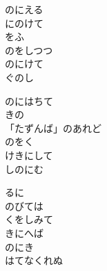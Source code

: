 \documentclass[10pt,b5j]{tarticle} %
\begin{document}
\vspace{1.5em} %
\newcommand{\linespace}{0.5em} %
\newcommand{\blocksize}{0.5\hsize} %
\begin{enumerate} %
    \begin{minipage}[c]{\blocksize}
    
        \vspace{\linespace}
        \item
        のにえる\\
        にのけて\\
        をふ\\
        のをしつつ\\
        のにけて\\
        ぐのし
        
        \vspace{\linespace}
        \item
        のにはちて\\
        きの\\
        「たずんば」のあれど\\
        のをく\\
        けきにして\\
        しのにむ
        
        \vspace{\linespace}
        \item
        るに\\
        のびては\\
        くをしみて\\
        きにへば\\
        のにき\\
        はてなくれぬ
        

\end{minipage}
\end{enumerate}
\end{document}
